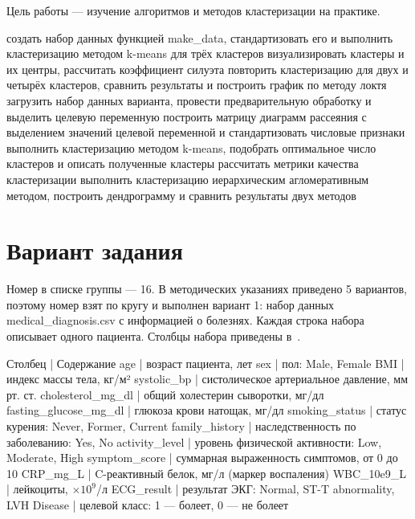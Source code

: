 \documentclass[a4paper,14pt]{extarticle}
\begin{document}
\maketitle
\suaitoc

\suaiintro

Цель работы — изучение алгоритмов и методов кластеризации на практике.

\suaitasks
создать набор данных функцией make\_data, стандартизовать его и выполнить кластеризацию методом k-means для трёх кластеров
визуализировать кластеры и их центры, рассчитать коэффициент силуэта
повторить кластеризацию для двух и четырёх кластеров, сравнить результаты и построить график по методу локтя
загрузить набор данных варианта, провести предварительную обработку и выделить целевую переменную
построить матрицу диаграмм рассеяния с выделением значений целевой переменной и стандартизовать числовые признаки
выполнить кластеризацию методом k-means, подобрать оптимальное число кластеров и описать полученные кластеры
рассчитать метрики качества кластеризации
выполнить кластеризацию иерархическим агломеративным методом, построить дендрограмму и сравнить результаты двух методов

\section{Вариант задания}

Номер в списке группы — 16. В методических указаниях приведено 5 вариантов, поэтому номер взят по кругу и выполнен вариант 1: набор данных medical\_diagnosis.csv с информацией о болезнях. Каждая строка набора описывает одного пациента. Столбцы набора приведены в~.

Столбец | Содержание
age | возраст пациента, лет
sex | пол: Male, Female
BMI | индекс массы тела, кг/м²
systolic\_bp | систолическое артериальное давление, мм рт. ст.
cholesterol\_mg\_dl | общий холестерин сыворотки, мг/дл
fasting\_glucose\_mg\_dl | глюкоза крови натощак, мг/дл
smoking\_status | статус курения: Never, Former, Current
family\_history | наследственность по заболеванию: Yes, No
activity\_level | уровень физической активности: Low, Moderate, High
symptom\_score | суммарная выраженность симптомов, от 0 до 10
CRP\_mg\_L | C-реактивный белок, мг/л (маркер воспаления)
WBC\_10e9\_L | лейкоциты, $\times 10^9$/л
ECG\_result | результат ЭКГ: Normal, ST-T abnormality, LVH
Disease | целевой класс: 1 — болеет, 0 — не болеет
\end{document}
